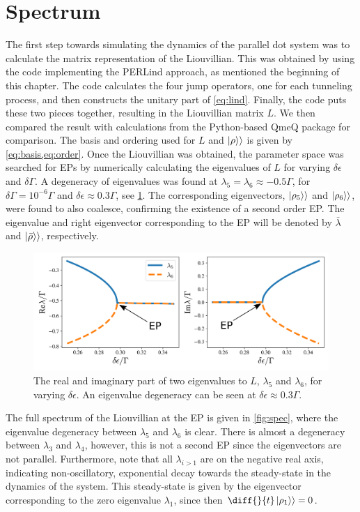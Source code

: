 \documentclass[../main.tex]{subfiles}
\begin{document}
\section{Spectrum}
The first step towards simulating the dynamics of the parallel dot system was to calculate the matrix representation of the Liouvillian. This was obtained by using the code implementing the PERLind approach, as mentioned the beginning of this chapter. The code calculates the four jump operators, one for each tunneling process, and then constructs the unitary part of \cref{eq:lind}. Finally, the code puts these two pieces together, resulting in the Liouvillian matrix $L$. We then compared the result with calculations from the Python-based QmeQ package \cite{qmeq} for comparison. The basis and ordering used for $L$ and $\ket{\rho}\rangle$ is given by \cref{eq:basis,eq:order}. Once the Liouvillian was obtained, the parameter space was searched for EPs by numerically calculating the eigenvalues of $L$ for varying $\delta\epsilon$ and $\delta\Gamma$. A degeneracy of eigenvalues was found at $\lambda_5 = \lambda_6\approx -0.5\Gamma$, for $\delta\Gamma = 10^{-6}\Gamma$ and $\delta\epsilon \approx 0.3\Gamma$, see \cref{fig:tuning}. The corresponding eigenvectors, $\ket{\rho_5}\rangle$ and $\ket{\rho_6}\rangle$, were found to also coalesce, confirming the existence of a second order EP. The eigenvalue and right eigenvector corresponding to the EP will be denoted by $\bar \lambda$ and $\ket{\bar\rho}\rangle$, respectively.
\begin{figure}[H]
    \centering
    \includegraphics[width=0.9\linewidth]{figures/tuning.png}
    \caption{The real and imaginary part of two eigenvalues to $L$, $\lambda_5$ and $\lambda_6$, for varying $\delta\epsilon$. An eigenvalue degeneracy can be seen at $\delta\epsilon\approx0.3\Gamma$.}
    \label{fig:tuning}
\end{figure}
The full spectrum of the Liouvillian at the EP is given in \cref{fig:spec}, where the eigenvalue degeneracy between $\lambda_5$ and $\lambda_6$ is clear. There is almost a degeneracy between $\lambda_3$ and $\lambda_4$, however, this is not a second EP since the eigenvectors are not parallel. Furthermore, note that all $\lambda_{i>1}$ are on the negative real axis, indicating non-oscillatory, exponential decay towards the steady-state in the dynamics of the system. This steady-state is given by the eigenvector corresponding to the zero eigenvalue $\lambda_1$, since then $\diff{}{t}\ket{\rho_1}\rangle = 0$.
\end{document}
